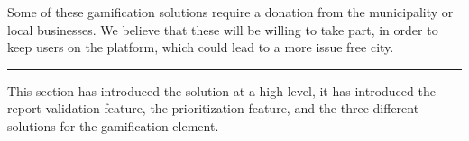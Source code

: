 Some of these gamification solutions require a donation from the municipality or local businesses. We believe that these will be willing to take part, in order to keep users on the platform, which could lead to a more issue free city.


\vspace{3em}
\hrule
This section has introduced the solution at a high level, it has introduced the report validation feature, the prioritization feature, and the three different solutions for the gamification element.